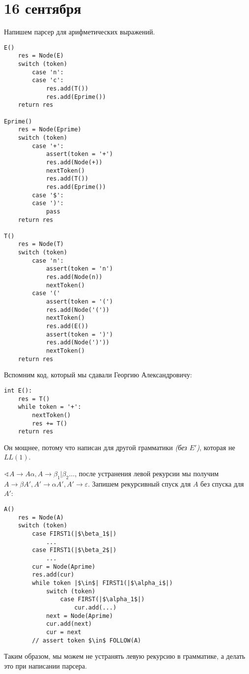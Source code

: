 \chapter{16 сентября}

\begin{example}
    Напишем парсер для арифметических выражений.

    \begin{verbatim}
E()
    res = Node(E)
    switch (token)
        case 'n':
        case 'c':
            res.add(T())
            res.add(Eprime())
    return res

Eprime()
    res = Node(Eprime)
    switch (token)
        case '+':
            assert(token = '+')
            res.add(Node(+))
            nextToken()
            res.add(T())
            res.add(Eprime())
        case '$':
        case ')':
            pass
    return res
    
T()
    res = Node(T)
    switch (token)
        case 'n':
            assert(token = 'n')
            res.add(Node(n))
            nextToken()
        case '('
            assert(token = '(')
            res.add(Node('('))
            nextToken()
            res.add(E())
            assert(token = ')')
            res.add(Node(')'))
            nextToken()
    return res
    \end{verbatim}

    Вспомним код, который мы сдавали Георгию Александровичу:
    \begin{verbatim}
int E():
    res = T()
    while token = '+':
        nextToken()
        res += T()
    return res
    \end{verbatim}

    Он мощнее, потому что написан для другой грамматики \textit{(без \(E'\))}, которая не \(LL(1)\).
\end{example}

\begin{example}
    \(\sphericalangle A \to A\alpha, A \to \beta_1|\beta_2\dots\), после устранения левой рекурсии мы получим \(A \to \beta A', A' \to \alpha A', A' \to \varepsilon\). Запишем рекурсивный спуск для \(A\) без спуска для \(A'\):
    \begin{verbatim}
A()
    res = Node(A)
    switch (token)
        case FIRST1(|$\beta_1$|)
            ...
        case FIRST1(|$\beta_2$|)
            ...
        cur = Node(Aprime)
        res.add(cur)
        while token |$\in$| FIRST1(|$\alpha_i$|)
            switch (token)
                case FIRST(|$\alpha_1$|)
                    cur.add(...)
            next = Node(Aprime)
            cur.add(next)
            cur = next
        // assert token $\in$ FOLLOW(A)
    \end{verbatim}
    Таким образом, мы можем не устранять левую рекурсию в грамматике, а делать это при написании парсера.
\end{example}

